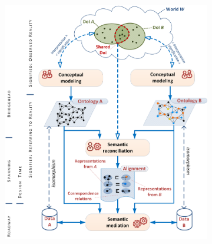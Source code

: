 \documentclass[sort&compress,preprint,authoryear,3p,twocolumn]{elsarticle}
\begin{document}
\begin{figure}
  \centering
  \begin{subfigure}[b]{.75\textwidth}
    \centering
    \includegraphics[width=\textwidth]{src/images/3SemanticConcerns.png}
    \caption{}
    \label{fig:concernsa}
  \end{subfigure}
  \hfill
  \begin{subfigure}[b]{.15\textwidth}
    \centering

\end{subfigure}
\end{figure}
\end{document}
